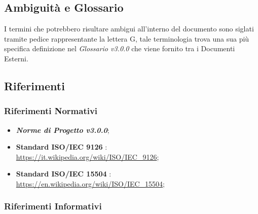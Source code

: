 \subsection{Ambiguità e Glossario}
I termini che potrebbero risultare ambigui all'interno del documento sono siglati tramite pedice rappresentante la lettera \textmd{G}, tale terminologia trova una sua più specifica definizione nel \textit{Glossario v3.0.0} che viene fornito tra i Documenti Esterni.

\subsection{Riferimenti}
\label{riferimenti}
\subsubsection{Riferimenti Normativi}

	\begin{itemize}
		\item \textbf{\textit{Norme di Progetto v3.0.0}};
		\item \textbf{Standard ISO/IEC 9126} : \\ \url{https://it.wikipedia.org/wiki/ISO/IEC_9126};
		\item \textbf{Standard ISO/IEC 15504} : \\ \url{https://en.wikipedia.org/wiki/ISO/IEC_15504};
	\end{itemize}


\subsubsection{Riferimenti Informativi}

